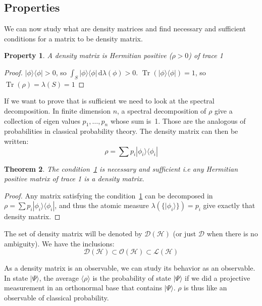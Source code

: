 \documentclass[10pt,a4paper]{report}
\theoremstyle{plain}
\newtheorem{thm}{Theorem}[chapter]
\newtheorem{prop}[thm]{Property}
\theoremstyle{definition}
\theoremstyle{remark}
\newcommand{\ket}[1]{|#1\rangle}
\newcommand{\bra}[1]{\langle#1|}
\newcommand{\dd}{\mathrm{d}}
\DeclareMathOperator{\Tr}{Tr}
\begin{document}
\subsection{Properties}

We can now study what are density matrices and find necessary and sufficient
conditions for a matrix to be density matrix.

\begin{prop}\label{prop:dens}
  A density matrix is Hermitian positive ($\rho > 0$) of trace 1
\end{prop}

\begin{proof}
  $\ket \phi \bra \phi > 0$, so $ \int_S \ket \phi \bra \phi \,\dd\lambda(\phi)
  > 0$.
  $\Tr(\ket \phi \bra \phi) = 1$, so $\Tr(\rho) = \lambda(S) = 1$
\end{proof}

If we want to prove that is sufficient we need to look at the spectral
decomposition.
In finite dimension $n$, a spectral decomposition of $\rho$ give a
collection of eigen values $p_1, \ldots, p_n$ whose sum is~1. Those are the
analogous of probabilities in classical probability theory. The density matrix
can then be written:
\[\rho = \sum p_i \ket {\phi_i} \bra {\phi_i}\]

\begin{thm} The condition~\ref{prop:dens} is necessary and sufficient i.e any Hermitian positive matrix of trace 1 is a density matrix.
\end{thm}

\begin{proof}
  Any matrix satisfying the condition~\ref{prop:dens} can be decomposed in
  $\rho = \sum p_i \ket {\phi_i} \bra {\phi_i}$, and thus the atomic measure
  $\lambda(\{\ket {\phi_i}\}) = p_i$ give exactly that density matrix.
\end{proof}

The set of density matrix will be denoted by $\mathcal{D}(\mathcal{H})$ (or just
$\mathcal{D}$ when there is no ambiguity). We have the inclusions:
\[\mathcal{D}(\mathcal{H}) \subset \mathcal{O}(\mathcal{H}) \subset \mathcal{L}(\mathcal{H})\]

As a density matrix is an observable, we can study its behavior as an observable.
In state $\ket \Psi$, the average $\langle \rho \rangle$ is the probability of
state $\ket \Psi$ if we did a projective measurement in an orthonormal base that
contains $\ket \Psi$. $\rho$ is thus like an observable of classical probability.
\end{document}
